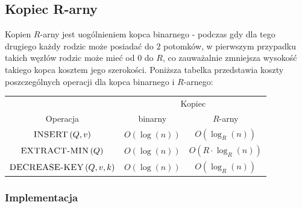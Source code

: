 \subsection{Kopiec R-arny}

Kopien $R$-arny jest uogólnieniem kopca binarnego - podczas gdy dla tego drugiego każdy rodzic może posiadać do $2$ potomków, w pierwszym przypadku takich węzłów rodzic może mieć od $0$ do $R$, co zauważalnie zmniejsza wysokość takiego kopca kosztem jego szerokości. Poniższa tabelka przedstawia koszty poszczególnych operacji dla kopca binarnego i $R$-arnego:

\begin{center}
	\begin{tabular}{ccc}
		& \multicolumn{2}{c}{Kopiec} \\
		\cline{2-3}
		Operacja & binarny & $R$-arny \\
		\hline
		$\textrm{\textsc{INSERT}} \left( Q, v \right)$ & $O \left( \log \left( n \right) \right)$ & $O \left( \log_{R} \left( n \right) \right)$ \\
		$\textrm{\textsc{EXTRACT-MIN}} \left( Q \right)$ & $O \left( \log \left( n \right) \right)$ & $O \left( R \cdot \log_{R} \left( n \right) \right)$ \\
		$\textrm{\textsc{DECREASE-KEY}} \left( Q, v, k \right)$ & $O \left( \log \left( n \right) \right)$ & $O \left( \log_{R} \left( n \right) \right)$  \\
		\hline
	\end{tabular}
\end{center}

\subsubsection{Implementacja}

